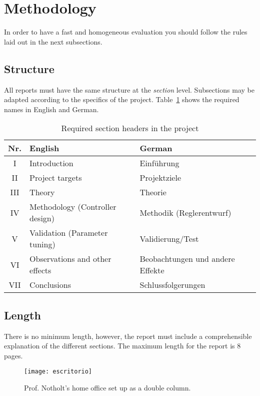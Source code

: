 \documentclass[a4paper, 10pt]{IEEEtran}
\begin{document}
	\section{Methodology} 
	
	In order to have a fast and homogeneous evaluation you should follow the rules laid out in the next subsections.
	
	\subsection{Structure}
	
	All reports must have the same structure at the \emph{section} level. Subsections may be adapted according to the specifics of the project. Table~\ref{tbl:sections} shows the required names in English and German.
	
	\begin{table}[hb]
		\caption{Required section headers in the project}\label{tbl:sections}
		\centering
		\begin{tabular}{cp{12em}p{12em}}
			\hline
			\bfseries Nr. & \bfseries English & \bfseries German\\
			\hline
			I & Introduction & Einführung\\
			II & Project targets & Projektziele \\
			III & Theory & Theorie \\
			IV & Methodology (Controller design) & Methodik (Reglerentwurf)\\
			V & Validation (Parameter tuning) & Validierung/Test \\
			VI & Observations and other effects & Beobachtungen und andere Effekte\\
			VII & Conclusions & Schlussfolgerungen\\
			\hline
		\end{tabular}
	\end{table}
	

	\subsection{Length}
	
	There is no minimum length, however, the report must include a comprehensible explanation of the different sections. The maximum length for the report is 8 pages.
	
	\begin{figure*}[hbt]
		\texttt{[image: escritorio]}
		\caption{Prof. Notholt's home office set up as a double column.}\label{fig:doublecolumn}
	\end{figure*}
	
\end{document}
